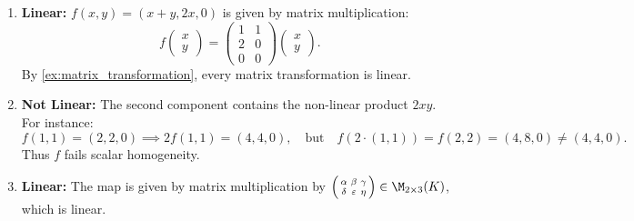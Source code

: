 \begin{exercisesolution*}
\label{sol:identifying_linear_maps_mc}
\begin{enumerate}[label=\textbf{(\arabic*)}]
    \item \textbf{Linear:} $f(x, y) = (x + y, 2x, 0)$ is given by matrix multiplication:
    \[
    f\begin{pmatrix} x \\ y \end{pmatrix} = \begin{pmatrix} 1 & 1 \\ 2 & 0 \\ 0 & 0 \end{pmatrix} \begin{pmatrix} x \\ y \end{pmatrix}.
    \]
    By \cref{ex:matrix_transformation}, every matrix transformation is linear.

    \item \textbf{Not Linear:} The second component contains the non-linear product $2xy$. For instance:
    \[
    f(1, 1) = (2, 2, 0) \implies 2 f(1, 1) = (4, 4, 0), \quad\text{but}\quad f(2 \cdot (1, 1)) = f(2, 2) = (4, 8, 0) \ne (4, 4, 0).
    \]
    Thus $f$ fails scalar homogeneity.

    \item \textbf{Linear:} The map is given by matrix multiplication by $\left(\begin{smallmatrix} \alpha & \beta & \gamma \\ \delta & \varepsilon & \eta \end{smallmatrix}\right) \in \M_{2 \times 3}(K)$, which is linear.
\end{enumerate}
\end{exercisesolution*}

